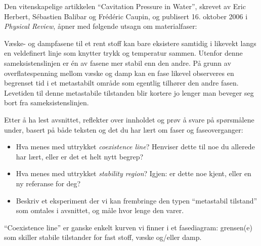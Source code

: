 
Den vitenskapelige artikkelen ``Cavitation Pressure in Water'', skrevet av Eric Herbert, S\'ebastien Balibar og Fr\'ed\'eric Caupin, og publisert 16. oktober 2006 i {\it Physical Review}, åpner med følgende utsagn om materialfaser:

\vskip 10pt {\narrower \noindent \baselineskip5pt

Væske- og dampfasene til et rent stoff kan bare eksistere samtidig i likevekt langs en veldefinert linje som knytter trykk og temperatur sammen. Utenfor denne sameksistenslinjen er én av fasene mer stabil enn den andre. På grunn av overflatespenning mellom væske og damp kan en fase likevel observeres en begrenset tid i et metastabilt område som egentlig tilhører den andre fasen. Levetiden til denne metastabile tilstanden blir kortere jo lenger man beveger seg bort fra sameksistenslinjen.

\par} \vskip 10pt

Etter å ha lest avsnittet, reflekter over innholdet og prøv å svare på spørsmålene under, basert på både teksten og det du har lært om faser og faseoverganger:

\begin{itemize}
\item{} Hva menes med uttrykket \textit{coexistence line}? Henviser dette til noe du allerede har lært, eller er det et helt nytt begrep?
\vskip 5pt
\item{} Hva menes med uttrykket \textit{stability region}? Igjen: er dette noe kjent, eller en ny referanse for deg?
\vskip 5pt
\item{} Beskriv et eksperiment der vi kan frembringe den typen ``metastabil tilstand'' som omtales i avsnittet, og måle hvor lenge den varer.
\end{itemize}







``Coexistence line'' er ganske enkelt kurven vi finner i et fasediagram: grensen(e) som skiller stabile tilstander for fast stoff, væske og/eller damp.

\vskip 10pt

